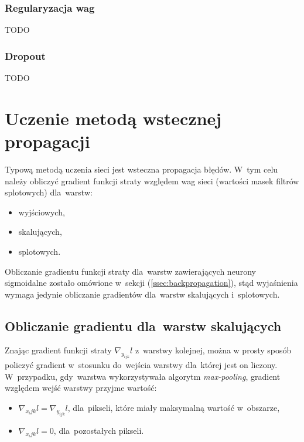 \subsubsection{Regularyzacja wag}
TODO
\subsubsection{Dropout}
TODO

\section{Uczenie metodą wstecznej propagacji}
Typową metodą uczenia sieci jest wsteczna propagacja błędów. W~tym celu należy obliczyć gradient funkcji
straty względem wag sieci (wartości masek filtrów splotowych) dla~warstw:
\begin{itemize}
  \item wyjściowych,
  \item skalujących,
  \item splotowych.
\end{itemize}
Obliczanie gradientu funkcji straty dla~warstw zawierających neurony sigmoidalne zostało omówione
w~sekcji (\ref{ssec:backpropagation}), stąd wyjaśnienia wymaga jedynie obliczanie gradientów dla~warstw skalujących i~splotowych.

\subsection{Obliczanie gradientu dla~warstw skalujących}
Znając gradient funkcji straty $\nabla_{y_{ijk}}l$ z~warstwy kolejnej, można w prosty sposób policzyć gradient
w~stosunku do~wejścia warstwy dla~której jest on liczony. W~przypadku, gdy~warstwa wykorzystywała algorytm
\textit{max-pooling}, gradient względem wejść warstwy przyjme wartość:
\begin{itemize}
  \item $\nabla_{x_ijk}l = \nabla_{y_{ijk}}l$, dla~pikseli, które miały maksymalną wartość w~obszarze, 
  \item $\nabla_{x_ijk}l = 0$, dla~pozostałych pikseli.
\end{itemize}

